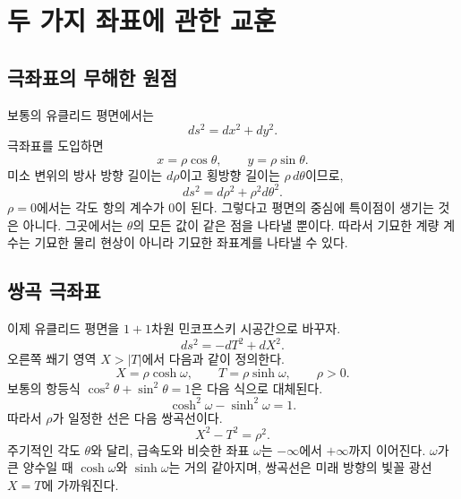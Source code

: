 \section{두 가지 좌표에 관한 교훈}

\subsection{극좌표의 무해한 원점}

보통의 유클리드 평면에서는
\begin{equation}
ds^2=dx^2+dy^2.
\end{equation}
극좌표를 도입하면
\begin{equation}
x=\rho\cos\theta,
\qquad
y=\rho\sin\theta .
\end{equation}
미소 변위의 방사 방향 길이는 \(d\rho\)이고 횡방향 길이는 \(\rho\,d\theta\)이므로,
\begin{equation}
ds^2=d\rho^2+\rho^2d\theta^2.
\label{eq:l03-polar}
\end{equation}
\(\rho=0\)에서는 각도 항의 계수가 0이 된다. 그렇다고 평면의 중심에 특이점이 생기는 것은 아니다. 그곳에서는 \(\theta\)의 모든 값이 같은 점을 나타낼 뿐이다. 따라서 기묘한 계량 계수는 기묘한 물리 현상이 아니라 기묘한 좌표계를 나타낼 수 있다.

\subsection{쌍곡 극좌표}

이제 유클리드 평면을 \(1+1\)차원 민코프스키 시공간으로 바꾸자.
\begin{equation}
ds^2=-dT^2+dX^2.
\end{equation}
오른쪽 쐐기 영역 \(X>|T|\)에서 다음과 같이 정의한다.
\begin{equation}
X=\rho\cosh\omega,
\qquad
T=\rho\sinh\omega,
\qquad \rho>0 .
\label{eq:l03-rindler-transform}
\end{equation}
보통의 항등식 \(\cos^2\theta+\sin^2\theta=1\)은 다음 식으로 대체된다.
\begin{equation}
\cosh^2\omega-\sinh^2\omega=1.
\end{equation}
따라서 \(\rho\)가 일정한 선은 다음 쌍곡선이다.
\begin{equation}
X^2-T^2=\rho^2.
\end{equation}
주기적인 각도 \(\theta\)와 달리, 급속도와 비슷한 좌표 \(\omega\)는 \(-\infty\)에서 \(+\infty\)까지 이어진다. \(\omega\)가 큰 양수일 때 \(\cosh\omega\)와 \(\sinh\omega\)는 거의 같아지며, 쌍곡선은 미래 방향의 빛꼴 광선 \(X=T\)에 가까워진다.

